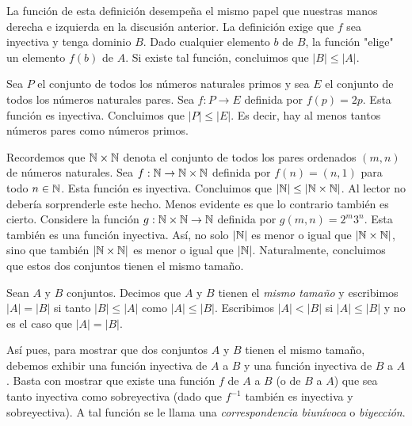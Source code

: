 \documentclass[12pt,a4paper]{book}
\newcommand{\comillas}[1]{"#1"}
\begin{document}
    La función de esta definición desempeña el mismo papel que nuestras manos derecha e izquierda en la discusión anterior.
    La definición exige que $f$ sea inyectiva y tenga dominio $B$. Dado cualquier elemento $b$ de $B$, la función
    \comillas{elige} un elemento $f(b)$ de $A$. Si existe tal función, concluimos que $|B|\leq|A|$.

    \begin{ejemplo}
        Sea $P$ el conjunto de todos los números naturales primos y sea $E$ el conjunto de todos los números naturales
        pares. Sea $f:P\rightarrow E$ definida por $f(p)=2p$. Esta función es inyectiva. Concluimos que $|P|\leq|E|$. Es
        decir, hay al menos tantos números pares como números primos.
    \end{ejemplo}

    \begin{ejemplo}\label{ej:NxN-mismo-tamano}
        Recordemos que $\mathbb{N}\times\mathbb{N}$ denota el conjunto de todos los pares ordenados $(m,n)$ de números naturales. Sea
        $f:\mathbb{N}\rightarrow\mathbb{N}\times\mathbb{N}$ definida por $f(n)=(n,1)$ para todo $n\in\mathbb{N}$. Esta función es inyectiva. Concluimos que
        $|\mathbb{N}|\leq|\mathbb{N}\times\mathbb{N}|$. Al lector no debería sorprenderle este hecho. Menos evidente es que lo contrario también es
        cierto. Considere la función $g:\mathbb{N}\times\mathbb{N}\rightarrow\mathbb{N}$ definida por $g(m,n)=2^{m}3^{n}$. Esta también es una
        función inyectiva. Así, no solo $|\mathbb{N}|$ es menor o igual que $|\mathbb{N}\times\mathbb{N}|$, sino que también $|\mathbb{N}\times\mathbb{N}|$ es menor
        o igual que $|\mathbb{N}|$. Naturalmente, concluimos que estos dos conjuntos tienen el mismo tamaño.
    \end{ejemplo}

    \begin{definicion}\label{def:mismo-tamano}
        Sean $A$ y $B$ conjuntos. Decimos que $A$ y $B$ tienen el \textit{mismo tamaño} y escribimos $|A|=|B|$ si tanto
        $|B|\leq|A|$ como $|A|\leq|B|$. Escribimos $|A|<|B|$ si $|A|\leq|B|$ y no es el caso que $|A|=|B|$.
    \end{definicion}

    Así pues, para mostrar que dos conjuntos $A$ y $B$ tienen el mismo tamaño, debemos exhibir una función inyectiva de
    $A$ a $B$ y una función inyectiva de $B$ a $A$. Basta con mostrar que existe una función $f$ de $A$ a $B$ (o de $B$ a
    $A$) que sea tanto inyectiva como sobreyectiva (dado que $f^{-1}$ también es inyectiva y sobreyectiva). A tal función
    se le llama una \textit{correspondencia biunívoca} o \textit{biyección}.
\end{document}
